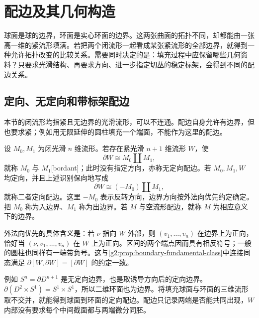 
% 
% 

\section{配边及其几何构造}
\label{g2:sec:2301}

球面是球的边界，环面是实心环面的边界。这两张曲面的拓扑不同，却都能由一张高一维的紧流形填满。若把两个闭流形一起看成某张紧流形的全部边界，就得到一种允许拓扑改变的比较关系。需要同时决定的是：填充过程中应保留哪些几何资料？只要求光滑结构、再要求方向、进一步指定切丛的稳定标架，会得到不同的配边关系。

\subsection{定向、无定向和带标架配边}
\label{g2:subsec:2301:01}
本节的闭流形均指紧且无边界的光滑流形，可以不连通。配边自身允许有边界，但也要求紧；例如用无限延伸的圆柱填充一个端面，不能作为这里的配边。

\begin{definition}\label{g2:def:unoriented-oriented-bordism}
	设 \(M_0,M_1\) 为闭光滑 \(n\) 维流形。若存在紧光滑 \(n+1\) 维流形 \(W\)，使
	\[
		\partial W\cong M_0\amalg M_1,
	\]
	就称 \(M_0\) 与 \(M_1\)[bordant]；此时没有指定方向，亦称无定向配边。若 \(M_0,M_1,W\) 均定向，并且上述识别保向地写成
	\[
		\partial W\cong(-M_0)\amalg M_1,
	\]
	就称二者定向配边。这里 \(-M_0\) 表示反转方向，边界方向按外法向优先约定确定。把 \(M_0\) 称为入边界、\(M_1\) 称为出边界。若 \(M\) 与空流形配边，就称 \(M\) 为相应意义下的边界。
\end{definition}

外法向优先的具体含义是：若 \(\nu\) 指向 \(W\) 外部，则 \((v_1,\ldots,v_n)\) 在边界上为正向，恰好当 \((\nu,v_1,\ldots,v_n)\) 在 \(W\) 上为正向。区间的两个端点因而具有相反符号；一般的圆柱也同样有一端带负号。这与\cref{g2:prop:boundary-fundamental-class}中连接同态满足 \(\partial[W,\partial W]=[\partial W]\) 的约定一致。

例如 \(S^n=\partial D^{n+1}\) 是无定向边界，也是取诱导方向后的定向边界。\(\partial(D^2\times S^1)=S^1\times S^1\)，所以二维环面也为边界。将填充球面与环面的三维流形取不交并，就能得到球面到环面的定向配边。配边只记录两端是否能共同出现，\(W\) 内部没有要求每个中间截面都与两端微分同胚。

